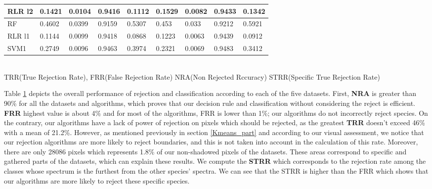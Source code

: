 \documentclass{siamart171218}
\begin{document}
\begin{table}[h!]
\begin{tabular}{lllllllll|}
\multicolumn{1}{|l|}{RLR l2} & \multicolumn{1}{l|}{0.1421} & \multicolumn{1}{l|}{0.0104} & \multicolumn{1}{l|}{0.9416} & \multicolumn{1}{l|}{0.1112} & \multicolumn{1}{l|}{0.1529} & \multicolumn{1}{l|}{0.0082} & \multicolumn{1}{l|}{0.9433} & 0.1342 \\ \hline
\multicolumn{1}{|l|}{RF} & \multicolumn{1}{l|}{0.4602} & \multicolumn{1}{l|}{0.0399} & \multicolumn{1}{l|}{0.9159} & \multicolumn{1}{l|}{0.5307} & \multicolumn{1}{l|}{0.453} & \multicolumn{1}{l|}{0.033} & \multicolumn{1}{l|}{0.9212} & 0.5921 \\ \hline
\multicolumn{1}{|l|}{RLR l1} & \multicolumn{1}{l|}{0.1144} & \multicolumn{1}{l|}{0.0099} & \multicolumn{1}{l|}{0.9418} & \multicolumn{1}{l|}{0.0868} & \multicolumn{1}{l|}{0.1223} & \multicolumn{1}{l|}{0.0063} & \multicolumn{1}{l|}{0.9439} & 0.0912 \\ \hline
\multicolumn{1}{|l|}{SVM1} & \multicolumn{1}{l|}{0.2749} & \multicolumn{1}{l|}{0.0096} & \multicolumn{1}{l|}{0.9463} & \multicolumn{1}{l|}{0.3974} & \multicolumn{1}{l|}{0.2321} & \multicolumn{1}{l|}{0.0069} & \multicolumn{1}{l|}{0.9483} & 0.3412 \\ \hline
\end{tabular}%
\\
TRR(True Rejection Rate), FRR(False Rejection Rate) NRA(Non Rejected Rccuracy) STRR(Specific True Rejection Rate)

\label{performance_overall}
\end{table}

Table \ref{performance_overall} depicts the overall performance of rejection and classification according to each of the five datasets. First, \textbf{NRA} is greater than 90\% for all the datasets and algorithms, which proves that our decision rule and classification without considering the reject is efficient. \textbf{FRR} highest value is about 4\% and for most of the algorithms, FRR is lower than 1\%; our algorithms do not incorrectly reject species. On the contrary, our algorithms have a lack of power of rejection on pixels which should be rejected, as the greatest \textbf{TRR} doesn't exceed 46\% with a mean of 21.2\%. However, as mentioned previously in section \ref{Kmeans_part} and according to our visual assessment, we notice that our rejection algorithms are more likely to reject boundaries, and this is not taken into account in the calculation of this rate. Moreover, there are only 28086 pixels which represents 1.8\% of our non-shadowed pixels of the datasets. These areas correspond to specific and gathered parts of the datasets, which can explain these results. We compute the \textbf{STRR} which corresponds to the rejection rate among the classes whose spectrum is the furthest from the other species' spectra. We can see that the STRR is higher than the FRR which shows that our algorithms are more likely to reject these specific species. 
\end{document}
